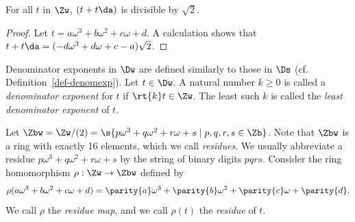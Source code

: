 \documentclass{article}
\begin{document}
\begin{lemma}\label{lem-divisiblebyroot2}
  For all $t$ in $\Zw$, $(t+t\da)$ is divisible by $\sqrt2$.
\end{lemma}

\begin{proof}
  Let $t=a\omega^3+b\omega^2+c\omega+d$. A calculation shows that
  $t+t\da = (-d\omega^3+d\omega+c-a)\sqrt2$.
\end{proof}

\begin{definition}
  Denominator exponents in $\Dw$ are defined similarly to those in
  $\Ds$ (cf. Definition~\ref{def-denomexp}).  Let $t\in\Dw$. A natural
  number $k\geq 0$ is called a {\em denominator exponent} for $t$ if
  $\rt{k} t \in \Zw$. The least such $k$ is called the {\em least
    denominator exponent} of $t$.
\end{definition}

\begin{definition}[Residues]
  Let $\Zbw = \Zw/(2) = \s{p\omega^3+q\omega^2+r\omega+s \mid
    p,q,r,s\in\Zb}$. Note that $\Zbw$ is a ring with exactly 16
  elements, which we call {\em residues}. We usually abbreviate a
  residue $p\omega^3+q\omega^2+r\omega+s$ by the string of binary
  digits $pqrs$.
  Consider the ring homomorphism $\rho : \Zw\to\Zbw$ defined by
  \[ \rho(a\omega^3+b\omega^2+c\omega+d) =
  \parity{a}\omega^3+\parity{b}\omega^2+\parity{c}\omega+\parity{d}.
  \]
  We call $\rho$ the {\em residue map}, and we call $\rho(t)$ the {\em
    residue} of $t$.
\end{definition}
\end{document}
